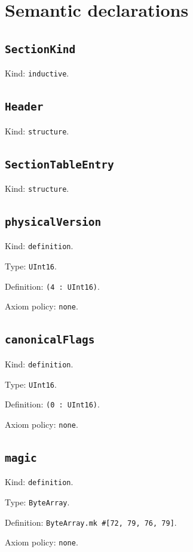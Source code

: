 \documentclass[11pt]{article}
\begin{document}
\section*{Semantic declarations}
\subsection*{\texttt{SectionKind}}
\noindent Kind: \texttt{inductive}.\par
\subsection*{\texttt{Header}}
\noindent Kind: \texttt{structure}.\par
\subsection*{\texttt{SectionTableEntry}}
\noindent Kind: \texttt{structure}.\par
\subsection*{\texttt{physicalVersion}}
\noindent Kind: \texttt{definition}.\par
\noindent Type: \texttt{UInt16}.\par
\noindent Definition: \texttt{(4 : UInt16)}.\par
\noindent Axiom policy: \texttt{none}.\par
\subsection*{\texttt{canonicalFlags}}
\noindent Kind: \texttt{definition}.\par
\noindent Type: \texttt{UInt16}.\par
\noindent Definition: \texttt{(0 : UInt16)}.\par
\noindent Axiom policy: \texttt{none}.\par
\subsection*{\texttt{magic}}
\noindent Kind: \texttt{definition}.\par
\noindent Type: \texttt{ByteArray}.\par
\noindent Definition: \texttt{ByteArray.mk \#[72, 79, 76, 79]}.\par
\noindent Axiom policy: \texttt{none}.\par
\end{document}
